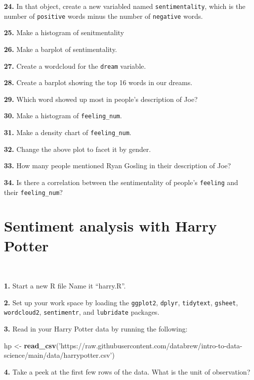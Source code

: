 \documentclass[]{book}
\newenvironment{Shaded}{\begin{snugshade}}{\end{snugshade}}
\newcommand{\KeywordTok}[1]{\textcolor[rgb]{0.13,0.29,0.53}{\textbf{#1}}}
\newcommand{\NormalTok}[1]{#1}
\newcommand{\StringTok}[1]{\textcolor[rgb]{0.31,0.60,0.02}{#1}}
\begin{document}
\textbf{24.} In that object, create a new variabled named \texttt{sentimentality}, which is the number of \texttt{positive} words minus the number of \texttt{negative} words.

\textbf{25.} Make a histogram of senitmentality

\textbf{26.} Make a barplot of sentimentality.

\textbf{27.} Create a wordcloud for the \texttt{dream} variable.

\textbf{28.} Create a barplot showing the top 16 words in our dreams.

\textbf{29.} Which word showed up most in people's description of Joe?

\textbf{30.} Make a histogram of \texttt{feeling\_num}.

\textbf{31.} Make a density chart of \texttt{feeling\_num}.

\textbf{32.} Change the above plot to facet it by gender.

\textbf{33.} How many people mentioned Ryan Gosling in their description of Joe?

\textbf{34.} Is there a correlation between the sentimentality of people's \texttt{feeling} and their \texttt{feeling\_num}?

\hypertarget{sentiment-analysis-with-harry-potter}{%
\chapter{Sentiment analysis with Harry Potter}\label{sentiment-analysis-with-harry-potter}}

~

\textbf{1.} Start a new R file Name it ``harry.R''.

\textbf{2.} Set up your work space by loading the \texttt{ggplot2}, \texttt{dplyr}, \texttt{tidytext}, \texttt{gsheet}, \texttt{wordcloud2}, \texttt{sentimentr}, and \texttt{lubridate} packages.

\textbf{3.} Read in your Harry Potter data by running the following:

\begin{Shaded}
\begin{Highlighting}[]
\NormalTok{hp <-}\StringTok{ }\KeywordTok{read_csv}\NormalTok{(}\StringTok{'https://raw.githubusercontent.com/databrew/intro-to-data-science/main/data/harrypotter.csv'}\NormalTok{)}
\end{Highlighting}
\end{Shaded}

\textbf{4.} Take a peek at the first few rows of the data. What is the unit of observation?
\end{document}
